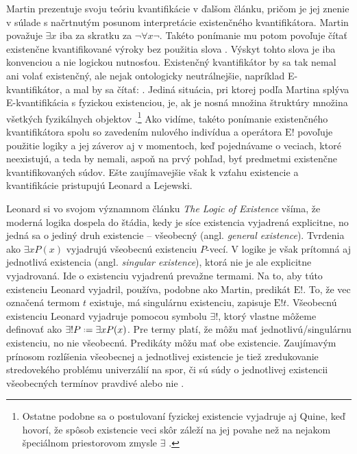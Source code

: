 \documentclass[12pt, letterpaper]{article}
\newcommand*{\defeq}{\mathrel{\vcenter{\baselineskip0.5ex \lineskiplimit0pt
                     \hbox{\scriptsize.}\hbox{\scriptsize.}}}%
                     =}
\begin{document}
Martin prezentuje svoju teóriu kvantifikácie v ďalšom článku, pričom je jej znenie v súlade s načrtnutým posunom interpretácie existenčného kvantifikátora. Martin považuje $\exists x$ iba za skratku za $\neg\forall x \neg$. Takéto ponímanie mu potom povoľuje čítať existenčne kvantifikované výroky bez použitia slova . Výskyt tohto slova je iba konvenciou a nie logickou nutnosťou. Existenčný kvantifikátor by sa tak nemal ani volať existenčný, ale nejak ontologicky neutrálnejšie, napríklad E-kvantifikátor, a mal by sa čítať: . Jediná situácia, pri ktorej podľa Martina splýva E-kvantifikácia s fyzickou existenciou, je, ak je nosná množina štruktúry množina všetkých fyzikálnych objektov \parencites[525--527]{martinkvant}.\footnote{Ostatne podobne sa o postulovaní fyzickej existencie vyjadruje aj Quine, keď hovorí, že spôsob existencie veci skôr záleží na jej povahe než na nejakom špeciálnom priestorovom zmysle $\exists$ \parencites[116]{QuineNotes}.} Ako vidíme, takéto ponímanie existenčného kvantifikátora spolu so zavedením nulového indivídua a operátora $\text{E}!$ povoľuje použitie logiky a jej záverov aj v momentoch, keď pojednávame o veciach, ktoré neexistujú, a teda by nemali, aspoň na prvý pohľad, byť predmetmi existenčne kvantifikovaných súdov. Ešte zaujímavejšie však k vzťahu existencie a kvantifikácie pristupujú Leonard a Lejewski.\par
Leonard si vo svojom významnom článku \textit{The Logic of Existence} všíma, že moderná logika dospela do štádia, kedy je síce existencia vyjadrená explicitne, no jedná sa o jediný druh existencie -- všeobecný (angl. \textit{general existence}). Tvrdenia ako $\exists x P(x)$ vyjadrujú všeobecnú existenciu $P$-vecí. V logike je však prítomná aj jednotlivá existencia (angl. \textit{singular existence}), ktorá nie je ale explicitne vyjadrovaná. Ide o existenciu vyjadrenú prevažne termami. Na to, aby túto existenciu Leonard vyjadril, používa, podobne ako Martin, predikát $\text{E}!$. To, že vec označená termom $t$ existuje, má singulárnu existenciu, zapisuje $\text{E}!t$. Všeobecnú existenciu Leonard vyjadruje pomocou symbolu $\exists !$, ktorý vlastne môžeme definovať ako $\exists ! P \defeq \exists x P(x)$. Pre termy platí, že môžu mať jednotlivú/singulárnu existenciu, no nie všeobecnú. Predikáty môžu mať obe existencie. Zaujímavým prínosom rozlíšenia všeobecnej a jednotlivej existencie je tiež zredukovanie stredovekého problému univerzálií na spor, či sú súdy o jednotlivej existencii všeobecných termínov pravdivé alebo nie \parencites[52]{leonard}.\par
\end{document}
